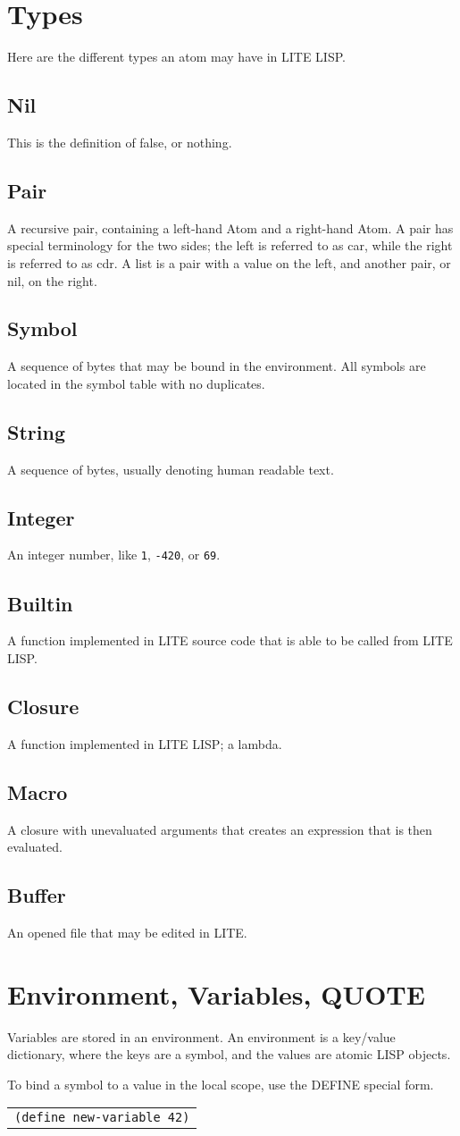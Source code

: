 \documentclass[
letterpaper,
oneside,
]{memoir}
\newcommand{\typedefinition}[2]{\section{#1}%

#2
}
\begin{document}
\chapter{Types}

Here are the different types an atom may have in LITE LISP.

\typedefinition{Nil}{This is the definition of false, or nothing.}

\typedefinition{Pair}{%
  A recursive pair, containing a left-hand Atom and a right-hand Atom.
  A pair has special terminology for the two sides; the left is referred to as car, while the right is referred to as cdr.
  A list is a pair with a value on the left, and another pair, or nil, on the right.
}

\typedefinition{Symbol}{%
  A sequence of bytes that may be bound in the environment.
  All symbols are located in the symbol table with no duplicates.
}

\typedefinition{String}{A sequence of bytes, usually denoting human readable text.}

\typedefinition{Integer}{An integer number, like \texttt{1}, \texttt{-420}, or \texttt{69}.}

\typedefinition{Builtin}{%
  A function implemented in LITE source code that is able to be called from LITE LISP.
}

\typedefinition{Closure}{A function implemented in LITE LISP; a lambda.}

\typedefinition{Macro}{%
  A closure with unevaluated arguments that creates an expression that is then evaluated.
}

\typedefinition{Buffer}{An opened file that may be edited in LITE.}

\chapter{Environment, Variables, QUOTE}

Variables are stored in an environment. An environment is a key/value dictionary, where the keys are a symbol, and the values are atomic LISP objects.

\vspace{1em}
\noindent
To bind a symbol to a value in the local scope, use the DEFINE special form.

\vspace{1em}
\begin{tabular}{l}
  \texttt{(define new-variable 42)} \\
\end{tabular}
\vspace{1em}
\end{document}
